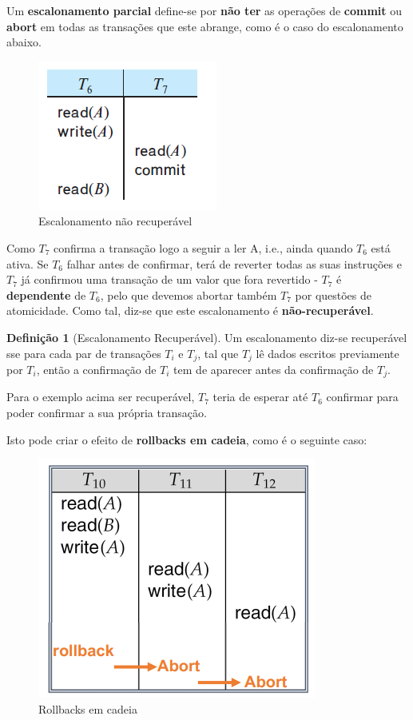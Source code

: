 \documentclass[oneside]{book}
\theoremstyle{definition}
\newtheorem{definition}{Definição}
\begin{document}
Um \textbf{escalonamento parcial} define-se por \textbf{não ter} as operações de \textbf{commit} ou \textbf{abort} em todas as transações que este abrange, como é o caso do escalonamento abaixo.
\begin{figure}[H]
    \centering
    \includegraphics[scale=0.3]{cap_transct/irrecuperavel_esc.png}
    \caption{Escalonamento não recuperável}
\end{figure}
Como $T_7$ confirma a transação logo a seguir a ler A, i.e., ainda quando $T_6$ está ativa. Se $T_6$ falhar antes de confirmar, terá de reverter todas as suas instruções e $T_7$ já confirmou uma transação de um valor que fora revertido - $T_7$ é \textbf{dependente} de $T_6$, pelo que devemos abortar também $T_7$ por questões de atomicidade. Como tal, diz-se que este escalonamento é \textbf{não-recuperável}.

\begin{definition}[Escalonamento Recuperável]
    Um escalonamento diz-se recuperável sse para cada par de transações $T_i$ e $T_j$, tal que $T_j$ lê dados escritos previamente por $T_i$, então a confirmação de $T_i$ tem de aparecer antes da confirmação de $T_j$.
\end{definition}

Para o exemplo acima ser recuperável, $T_7$ teria de esperar até $T_6$ confirmar para poder confirmar a sua própria transação.

Isto pode criar o efeito de \textbf{rollbacks em cadeia}, como é o seguinte caso:
\begin{figure}[H]
    \centering
    \includegraphics[scale=0.3]{cap_transct/cadeia_rollback.png}
    \caption{Rollbacks em cadeia}
\end{figure}
\end{document}
